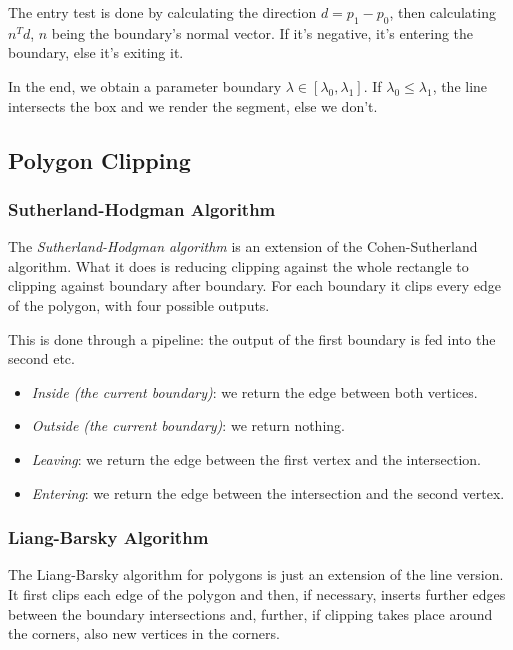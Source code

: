 \documentclass[english]{panikzettel}
\begin{document}
The entry test is done by calculating the direction $d = p_1 - p_0$, then calculating $n^Td$, $n$ being the boundary's normal vector. If it's negative, it's entering the boundary, else it's exiting it.

In the end, we obtain a parameter boundary $\lambda \in [\lambda_0,\lambda_1]$. If $\lambda_0 \le \lambda_1$, the line intersects the box and we render the segment, else we don't.

\subsection{Polygon Clipping}

\subsubsection*{Sutherland-Hodgman Algorithm}

\begin{halfboxl}
The \emph{Sutherland-Hodgman algorithm} is an extension of the Cohen-Sutherland algorithm. What it does is reducing clipping against the whole rectangle to clipping against boundary after boundary. For each boundary it clips every edge of the polygon, with four possible outputs.

This is done through a pipeline: the output of the first boundary is fed into the second etc.
\end{halfboxl}%
\begin{halfboxr}
\begin{itemize}
    \item \emph{Inside (the current boundary)}: we return the edge between both vertices.
    \item \emph{Outside (the current boundary)}: we return nothing.
    \item \emph{Leaving}: we return the edge between the first vertex and the intersection.
    \item \emph{Entering}: we return the edge between the intersection and the second vertex.
\end{itemize}
\end{halfboxr}

\subsubsection*{Liang-Barsky Algorithm}

The Liang-Barsky algorithm for polygons is just an extension of the line version. It first clips each edge of the polygon and then, if necessary, inserts further edges between the boundary intersections and, further, if clipping takes place around the corners, also new vertices in the corners.
\end{document}
